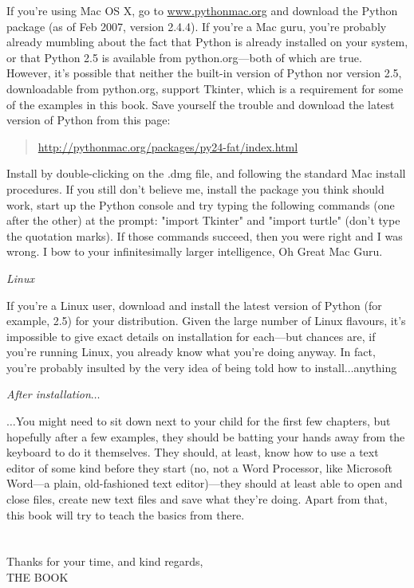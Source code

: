 \noindent
If you're using Mac OS X, go to \href{www.pythonmac.org}{www.pythonmac.org} and download the Python package (as of Feb 2007, version 2.4.4).  If you're a Mac guru, you're probably already mumbling about the fact that Python is already installed on your system, or that Python 2.5 is available from python.org---both of which are true.  However, it's possible that neither the built-in version of Python nor version 2.5, downloadable from python.org, support Tkinter, which is a requirement for some of the examples in this book.  Save yourself the trouble and download the latest version of Python from this page:
\begin{quote}
    \href{http://pythonmac.org/packages/py24-fat/index.html}{http://pythonmac.org/packages/py24-fat/index.html}
\end{quote}
\noindent
Install by double-clicking on the .dmg file, and following the standard Mac install procedures.
If you still don't believe me, install the package you think should work, start up the Python console and try typing the following commands (one after the other) at the prompt: "import Tkinter" and "import turtle" (don't type the quotation marks).  If those commands succeed, then you were right and I was wrong.  I bow to your infinitesimally larger intelligence, Oh Great Mac Guru.

\noindent
\emph{\color{BrickRed}Linux}

\noindent
If you're a Linux user, download and install the latest version of Python (for example, 2.5) for your distribution.  Given the large number of Linux flavours, it's impossible to give exact details on installation for each---but chances are, if you're running Linux, you already know what you're doing anyway.  In fact, you're probably insulted by the very idea of being told how to install$\ldots$anything

\noindent
\emph{\color{BrickRed}After installation$\ldots$}

\noindent
$\ldots$You might need to sit down next to your child for the first few chapters, but hopefully after a few examples, they should be batting your hands away from the keyboard to do it themselves.  They should, at least, know how to use a text editor of some kind before they start (no, not a Word Processor, like Microsoft Word---a plain, old-fashioned text editor)---they should at least able to open and close files, create new text files and save what they're doing.  Apart from that, this book will try to teach the basics from there.
\\
\\
\noindent\\
Thanks for your time, and kind regards,
\noindent\\
THE BOOK